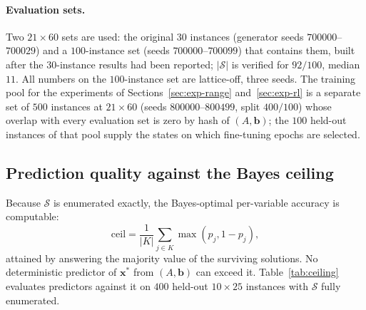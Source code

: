 \documentclass[preprint,12pt]{elsarticle}
\newcommand{\SOL}{\mathcal{S}}
\begin{document}
\paragraph{Evaluation sets.} Two $21\times60$ sets are used: the original $30$ instances (generator seeds $700000$--$700029$) and a $100$-instance set (seeds $700000$--$700099$) that contains them, built after the $30$-instance results had been reported; $|\SOL|$ is verified for $92/100$, median $11$. All numbers on the $100$-instance set are lattice-off, three seeds. The training pool for the experiments of Sections~\ref{sec:exp-range} and~\ref{sec:exp-rl} is a separate set of $500$ instances at $21\times60$ (seeds $800000$--$800499$, split $400/100$) whose overlap with every evaluation set is zero by hash of $(A,\mathbf{b})$; the $100$ held-out instances of that pool supply the states on which fine-tuning epochs are selected.

\subsection{Prediction quality against the Bayes ceiling}
\label{sec:exp-ceiling}

Because $\SOL$ is enumerated exactly, the Bayes-optimal per-variable accuracy is computable:
\begin{equation}
\mathrm{ceil} = \frac{1}{|K|}\sum_{j\in K}\max(p_j, 1-p_j),
\label{eq:ceiling}
\end{equation}
attained by answering the majority value of the surviving solutions. No deterministic predictor of $\mathbf{x}^\ast$ from $(A,\mathbf{b})$ can exceed it. Table~\ref{tab:ceiling} evaluates predictors against it on $400$ held-out $10\times25$ instances with $\SOL$ fully enumerated.

\begin{table}[h]
\centering
{}
\caption{Root-level prediction against the exact posterior on the $182$ root states of the held-out $10\times25$ evaluation pool. The network is the same checkpoint used in every search experiment below. ``top-3'' restricts to the three variables the predictor is most confident about.}
\label{tab:ceiling}
\end{table}
\end{document}
